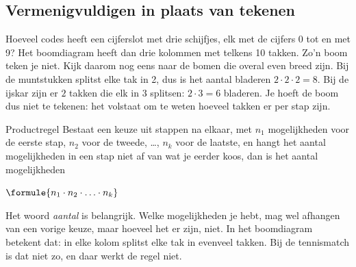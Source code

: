 \subsection{Vermenigvuldigen in plaats van tekenen}

Hoeveel codes heeft een cijferslot met drie schijfjes, elk met de cijfers 0 tot en met 9? Het boomdiagram heeft dan drie kolommen met telkens 10 takken. Zo'n boom teken je niet. Kijk daarom nog eens naar de bomen die overal even breed zijn. Bij de muntstukken splitst elke tak in 2, dus is het aantal bladeren $2 \cdot 2 \cdot 2 = 8$. Bij de ijskar zijn er $2$ takken die elk in $3$ splitsen: $2 \cdot 3 = 6$ bladeren. Je hoeft de boom dus niet te tekenen: het volstaat om te weten hoeveel takken er per stap zijn.

\begin{theorie}
\begin{stelling}{Productregel}
Bestaat een keuze uit stappen na elkaar, met $n_1$ mogelijkheden voor de eerste stap, $n_2$ voor de tweede, \ldots, $n_k$ voor de laatste, en hangt het aantal mogelijkheden in een stap niet af van wat je eerder koos, dan is het aantal mogelijkheden

\vspace{1mm}
\qquad $\formule{n_1 \cdot n_2 \cdot \ldots \cdot n_k}$
\end{stelling}
\end{theorie}

Het woord \textit{aantal} is belangrijk. Welke mogelijkheden je hebt, mag wel afhangen van een vorige keuze, maar hoeveel het er zijn, niet. In het boomdiagram betekent dat: in elke kolom splitst elke tak in evenveel takken. Bij de tennismatch is dat niet zo, en daar werkt de regel niet.



